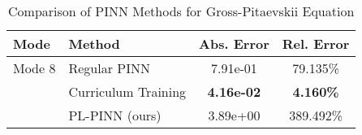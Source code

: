 \begin{table}[htbp]
\centering
\caption{Comparison of PINN Methods for Gross-Pitaevskii Equation}
\label{tab:pinn_comparison}
\begin{tabular}{llcc}
\toprule
Mode & Method & Abs. Error & Rel. Error \\
\midrule
Mode 8 & Regular PINN & 7.91e-01 & 79.135\% \\
 & Curriculum Training & \textbf{4.16e-02} & \textbf{4.160\%} \\
 & PL-PINN (ours) & 3.89e+00 & 389.492\% \\
\bottomrule
\end{tabular}
\end{table}